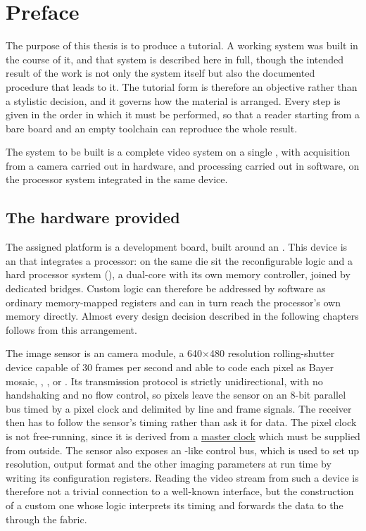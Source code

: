\chapter{Preface}
\label{chap:preface}

The purpose of this thesis is to produce a tutorial. A working system was built in the course of it, and that system is described here in full, though the intended result of the work is not only the system itself but also the documented procedure that leads to it. The tutorial form is therefore an objective rather than a stylistic decision, and it governs how the material is arranged. Every step is given in the order in which it must be performed, so that a reader starting from a bare board and an empty toolchain can reproduce the whole result.

The system to be built is a complete video system on a single , with acquisition from a camera carried out in hardware, and processing carried out in software, on the processor system integrated in the same device.

\section{The hardware provided}

The assigned platform is a  development board, built around an . This device is an  that integrates a processor: on the same die sit the reconfigurable logic and a hard processor system (), a dual-core  with its own  memory controller, joined by dedicated  bridges. Custom logic can therefore be addressed by software as ordinary memory-mapped registers and can in turn reach the processor's own  memory directly. Almost every design decision described in the following chapters follows from this arrangement.

The image sensor is an  camera module, a 640$\times$480 resolution  rolling-shutter device capable of 30 frames per second and able to code each pixel as Bayer mosaic, , ,  or . Its transmission protocol is strictly unidirectional, with no handshaking and no flow control, so pixels leave the sensor on an 8-bit parallel bus timed by a pixel clock and delimited by line and frame signals. The receiver then has to follow the sensor's timing rather than ask it for data. The pixel clock is not free-running, since it is derived from a \uline{master clock} which must be supplied from outside. The sensor also exposes an -like control bus, which is used to set up resolution, output format and the other imaging parameters at run time by writing its configuration registers. Reading the video stream from such a device is therefore not a trivial connection to a well-known interface, but the construction of a custom one whose logic interprets its timing and forwards the data to the  through the  fabric.

